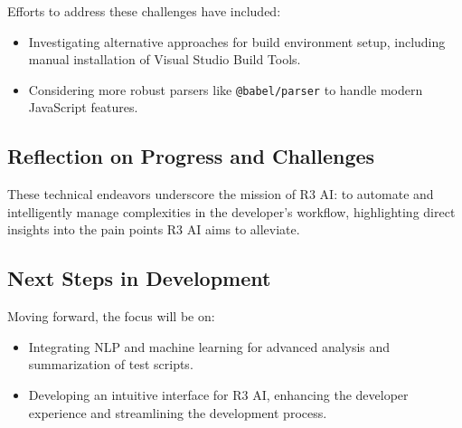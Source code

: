 \documentclass[12pt]{article}
\begin{document}
Efforts to address these challenges have included:
\begin{itemize}
    \item Investigating alternative approaches for build environment setup, including manual installation of Visual Studio Build Tools.
    \item Considering more robust parsers like \texttt{@babel/parser} to handle modern JavaScript features.
\end{itemize}

\subsection*{Reflection on Progress and Challenges}

These technical endeavors underscore the mission of R3 AI: to automate and intelligently manage complexities in the developer's workflow, highlighting direct insights into the pain points R3 AI aims to alleviate.

\subsection*{Next Steps in Development}

Moving forward, the focus will be on:
\begin{itemize}
    \item Integrating NLP and machine learning for advanced analysis and summarization of test scripts.
    \item Developing an intuitive interface for R3 AI, enhancing the developer experience and streamlining the development process.
\end{itemize}
\end{document}
